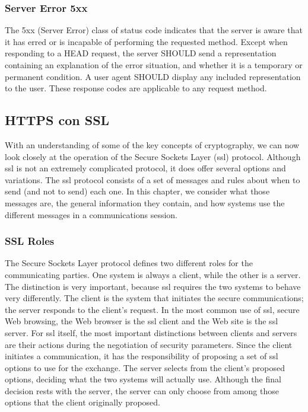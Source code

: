\subsubsection{Server Error 5xx}

   The 5xx (Server Error) class of status code indicates that the server
   is aware that it has erred or is incapable of performing the
   requested method.  Except when responding to a HEAD request, the
   server SHOULD send a representation containing an explanation of the
   error situation, and whether it is a temporary or permanent   condition.  A user agent SHOULD display any included representation
   to the user.  These response codes are applicable to any request
   method.

  

\subsection{HTTPS con SSL} 

With an understanding of some of the key concepts of cryptography,
we can now look closely at the operation of the Secure Sockets Layer
(ssl) protocol. Although ssl is not an extremely complicated protocol, 
it does offer several options and variations. 
The ssl protocol consists of a set of messages and rules about when
to send (and not to send) each one. In this chapter, we consider what
those messages are, the general information they contain, and how
systems use the different messages in a communications session. 

\subsubsection{SSL Roles}
The Secure Sockets Layer protocol defines two different roles for the
communicating parties. One system is always a client, while the other
is a server. The distinction is very important, because ssl requires the
two systems to behave very differently. The client is the system that
initiates the secure communications; the server responds to the client’s request. 
In the most common use of ssl, secure Web browsing,
the Web browser is the ssl client and the Web site is the ssl server.
For ssl itself, the most important distinctions between clients and
servers are their actions during the negotiation of security parameters. 
Since the client initiates a communication, it has the
responsibility of proposing a set of ssl options to use for the
exchange. The server selects from the client’s proposed options,
deciding what the two systems will actually use. Although the final
decision rests with the server, the server can only choose from among
those options that the client originally proposed.

